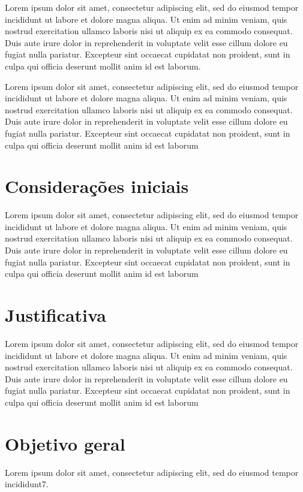 \documentclass[msc, classic, a4paper, oneside]{ufbathesis}
\date{2019}
\begin{document}
\pgcompfrontpage{}
\frontmatter

\resumo
Lorem ipsum dolor sit amet, consectetur adipiscing elit, sed do eiusmod tempor incididunt ut labore et dolore magna aliqua. Ut enim ad minim veniam, quis nostrud exercitation ullamco laboris nisi ut aliquip ex ea commodo consequat. Duis aute irure dolor in reprehenderit in voluptate velit esse cillum dolore eu fugiat nulla pariatur. Excepteur sint occaecat cupidatat non proident, sunt in culpa qui officia deserunt mollit anim id est laborum.


\abstract
Lorem ipsum dolor sit amet, consectetur adipiscing elit, sed do eiusmod tempor incididunt ut labore et dolore magna aliqua. Ut enim ad minim veniam, quis nostrud exercitation ullamco laboris nisi ut aliquip ex ea commodo consequat. Duis aute irure dolor in reprehenderit in voluptate velit esse cillum dolore eu fugiat nulla pariatur. Excepteur sint occaecat cupidatat non proident, sunt in culpa qui officia deserunt mollit anim id est laborum


\tableofcontents
\listoffigures
\listoftables
\mainmatter



\section{Considerações iniciais}
Lorem ipsum dolor sit amet, consectetur adipiscing elit, sed do eiusmod tempor incididunt ut labore et dolore magna aliqua. Ut enim ad minim veniam, quis nostrud exercitation ullamco laboris nisi ut aliquip ex ea commodo consequat. Duis aute irure dolor in reprehenderit in voluptate velit esse cillum dolore eu fugiat nulla pariatur. Excepteur sint occaecat cupidatat non proident, sunt in culpa qui officia deserunt mollit anim id est laborum

\section{Justificativa}
Lorem ipsum dolor sit amet, consectetur adipiscing elit, sed do eiusmod tempor incididunt ut labore et dolore magna aliqua. Ut enim ad minim veniam, quis nostrud exercitation ullamco laboris nisi ut aliquip ex ea commodo consequat. Duis aute irure dolor in reprehenderit in voluptate velit esse cillum dolore eu fugiat nulla pariatur. Excepteur sint occaecat cupidatat non proident, sunt in culpa qui officia deserunt mollit anim id est laborum

\section{Objetivo geral}
Lorem ipsum dolor sit amet, consectetur adipiscing elit, sed do eiusmod tempor incididunt7.
\end{document}
